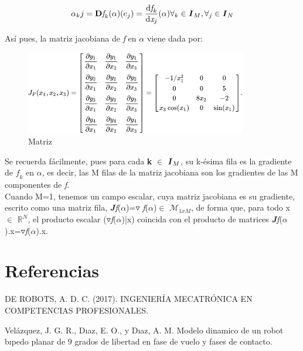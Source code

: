 \documentclass[letter,openrigh,12pt,spanish]{report}
\begin{document}
\begin{displaymath}
\alpha_kj=\textbf{D}\textit{f}_k(\alpha)(e_j)= \frac{\mathrm{d}\textit{f}_k}{\mathrm{d}\textit{x}_j}(\alpha)  \forall_k \in \textbf{\textit{I}}_M, \forall_j\in\textbf{\textit{I}}_N
\end{displaymath}

As\'i pues, la matriz jacobiana de \textit{f} en $\alpha$ viene dada por:\\

\begin{figure}[htp]
\centering
\includegraphics[scale=1]{1.png} 
\caption{Matriz}
\label{Figura}
\end{figure}

Se recuerda f\'acilmente, pues para cada \textbf{k} $\in$ $\textbf{\textit{I}}_M$, su k-\'esima fila es la gradiente de $\textit{f}_k$ en $\alpha$, es decir, las M filas de la matriz jacobiana son los gradientes de las M componentes de \textit{f}.\\
Cuando M=1, tenemos un campo escalar, cuya matriz jacobiana es su gradiente, escrito como una matriz fila, \textbf{\textit{J}}\textit{f}($\alpha$)=$\triangledown$ \textit{f}($\alpha$)$\in$ $\mathcal{M}_{1xM}$, de forma que, para todo x $\in$ $\mathbb{R}^N$, el producto escalar ($\triangledown$\textit{f}($\alpha$)|x) coincida con el producto de matrices \textbf{\textit{J}}\textit{f}($\alpha$).x=$\triangledown$\textit{f}($\alpha$).x. 



\section{Referencias}
DE ROBOTS, A. D. C. (2017). INGENIERÍA MECATRÓNICA EN COMPETENCIAS PROFESIONALES.

Velázquez, J. G. R., Dıaz, E. O., y Dıaz, A. M. Modelo dinamico de un robot bıpedo planar de 9 grados de libertad en fase de vuelo y fases de contacto.
\end{document}
